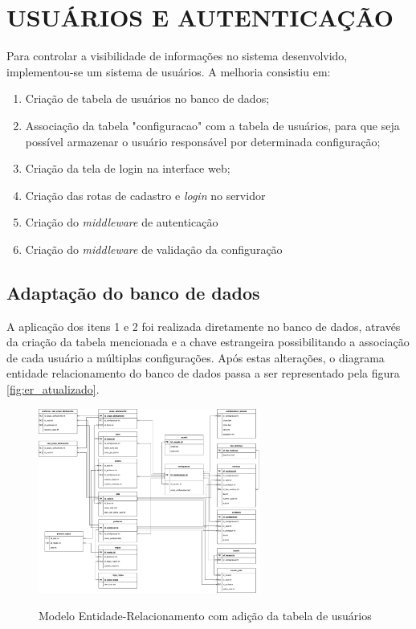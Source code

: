 \section{USUÁRIOS E AUTENTICAÇÃO}

Para controlar a visibilidade de informações no sistema desenvolvido, implementou-se um sistema de usuários. A melhoria consistiu em:

\begin{enumerate}
	\item Criação de tabela de usuários no banco de dados;
	\item Associação da tabela "configuracao" com a tabela de usuários, para que seja possível armazenar o usuário responsável por determinada configuração;
	\item Criação da tela de login na interface web;
	\item Criação das rotas de cadastro e \textit{login} no servidor
	\item Criação do \textit{middleware} de autenticação
	\item Criação do \textit{middleware} de validação da configuração
\end{enumerate}

\subsection{Adaptação do banco de dados}
A aplicação dos itens 1 e 2 foi realizada diretamente no banco de dados, através da criação da tabela mencionada e a chave estrangeira possibilitando a associação de cada usuário a múltiplas configurações. Após estas alterações, o diagrama entidade relacionamento do banco de dados passa a ser representado pela figura \ref{fig:er_atualizado}.

\begin{figure}[!htb]
	\centering
	\caption{Modelo Entidade-Relacionamento com adição da tabela de usuários}
	\includegraphics[width=0.65\textwidth]{./dados/figuras/er_horario_com_usuario}
	\label{fig:er_atualizado-uc}
\end{figure}

